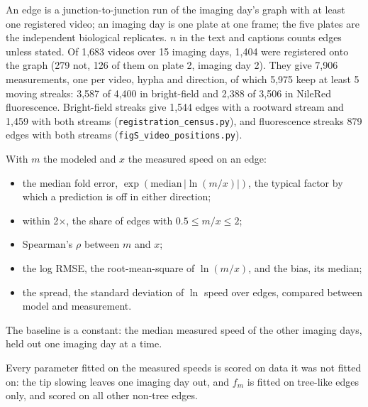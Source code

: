 
An edge is a junction-to-junction run of the imaging day's graph with at least one registered video; an imaging day is one plate at one frame; the five plates are the independent biological replicates. $n$ in the text and captions counts edges unless stated.
Of 1,683 videos over 15 imaging days, 1,404 were registered onto the graph (279 not, 126 of them on plate 2, imaging day 2).
They give 7,906 measurements, one per video, hypha and direction, of which 5,975 keep at least 5 moving streaks: 3,587 of 4,400 in bright-field and 2,388 of 3,506 in NileRed fluorescence.
Bright-field streaks give 1,544 edges with a rootward stream and 1,459 with both streams (\texttt{registration\_census.py}), and fluorescence streaks 879 edges with both streams (\texttt{figS\_video\_positions.py}).

With $m$ the modeled and $x$ the measured speed on an edge:
\begin{itemize}
  \item the median fold error, $\exp(\mathrm{median}\,|\ln(m/x)|)$, the typical factor by which a prediction is off in either direction;
  \item within 2$\times$, the share of edges with $0.5 \leq m/x \leq 2$;
  \item Spearman's $\rho$ between $m$ and $x$;
  \item the log RMSE, the root-mean-square of $\ln(m/x)$, and the bias, its median;
  \item the spread, the standard deviation of $\ln$ speed over edges, compared between model and measurement.
\end{itemize}
The baseline is a constant: the median measured speed of the other imaging days, held out one imaging day at a time.

Every parameter fitted on the measured speeds is scored on data it was not fitted on: the tip slowing leaves one imaging day out, and $f_m$ is fitted on tree-like edges only, and scored on all other non-tree edges.

